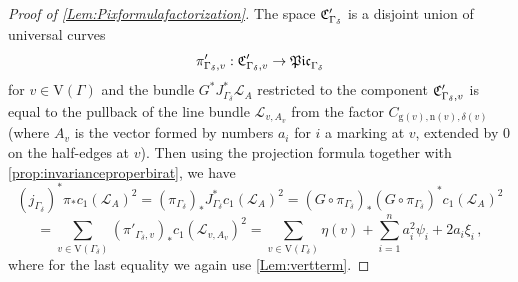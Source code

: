 \documentclass[a4paper,12pt]{article} %
\newcommand{\ca}[1]{{\mathcal{#1}}}
\def\n{\mathrm{n}}
\def\V{\mathrm{V}}
\def\g{\mathrm{g}}
\theoremstyle{definition}
\newtheorem{remark}[definition]{Remark}
\theoremstyle{plain}%
\newcommand{\Picabs}{\mathfrak{Pic}}
\begin{document}
\begin{proof}[Proof of \cref{Lem:Pixformulafactorization}]
The space $\frak C'_{\Gamma_{\delta}}$ is a disjoint union of universal curves 
$$\pi'_{\Gamma_\delta,v} : \frak C'_{\Gamma_{\delta},v} \to \Picabs_{\Gamma_\delta}$$
for $v \in \V(\Gamma)$ and the bundle  $G^* J_{\Gamma_\delta}^* \ca L_A$ restricted to the component $\frak C'_{\Gamma_{\delta},v}$ is equal to the pullback of the line bundle $\ca L_{v, A_v}$ from the factor $C_{\g(v),\n(v),\delta(v)}$ (where $A_v$ is the vector formed by numbers $a_i$ for $i$ a marking at $v$, extended by $0$ on the half-edges at $v$). Then using the projection formula together with \cref{prop:invarianceproperbirat}, we have
    $$(j_{\Gamma_\delta})^* \pi_* c_1(\ca L_A)^2 = (\pi_{\Gamma_\delta})_* J_{\Gamma_\delta}^* c_1(\ca L_A)^2 = (G \circ \pi_{\Gamma_\delta})_* (G \circ \pi_{\Gamma_\delta})^*c_1(\ca L_A)^2$$
    $$= \sum_{v \in \V(\Gamma_\delta)}(\pi'_{\Gamma_\delta,v})_* c_1(\ca L_{v, A_v})^2 = \sum_{v \in \V(\Gamma_\delta)} \eta(v) + \sum_{i=1}^n  a_i^2 \psi_i + 2 a_i \xi_i\, ,$$
where for the last equality we again use \cref{Lem:vertterm}.
\end{proof}
\end{document}
